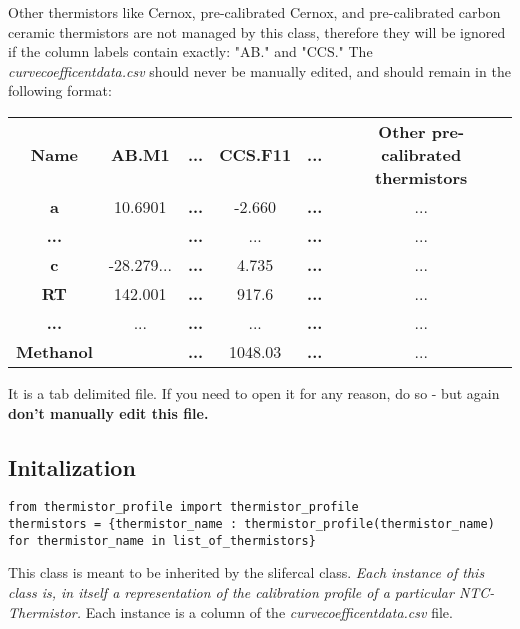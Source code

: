 \documentclass[12pt]{article}
\begin{document}
Other thermistors like Cernox, pre-calibrated Cernox, and pre-calibrated carbon ceramic thermistors are not managed by this class, therefore they will be ignored if the column labels contain exactly: "AB." and "CCS."  The \textit{curve{\textunderscore}coefficent{\textunderscore}{\textunderscore}data.csv} should never be manually edited, and should remain in the following format:
\begin{table}[H]
\begin{tabular}{cccccc}
\textbf{Name}     & \textbf{AB.M1} & \textbf{...} & \textbf{CCS.F11} & \textbf{...} & \textbf{Other pre-calibrated thermistors} \\
\textbf{a}        & 10.6901        & \textbf{...} & -2.660           & \textbf{...} & ...                                       \\
\textbf{...}      &                & \textbf{...} & ...              & \textbf{...} & ...                                       \\
\textbf{c}        & -28.279...     & \textbf{...} & 4.735            & \textbf{...} & ...                                       \\
\textbf{RT}       & 142.001        & \textbf{...} & 917.6            & \textbf{...} & ...                                       \\
\textbf{...}      & ...            & \textbf{...} & ...              & \textbf{...} & ...                                       \\
\textbf{Methanol} &                & \textbf{...} & 1048.03          & \textbf{...} & ...                                      
\end{tabular}
\end{table}

It is a tab delimited file. If you need to open it for any reason, do so - but again \textbf{don't manually edit this file.}

\subsection{Initalization}
\begin{lstlisting}
from thermistor_profile import thermistor_profile
thermistors = {thermistor_name : thermistor_profile(thermistor_name) for thermistor_name in list_of_thermistors}
\end{lstlisting}
This class is meant to be inherited by the slifercal class. \textcolor{YellowOrange}{\textit{Each instance of this class is, in itself a representation of the calibration profile of a particular NTC-Thermistor.}} Each instance is a column of the \textit{curve{\textunderscore}coefficent{\textunderscore}{\textunderscore}data.csv} file.
\end{document}
